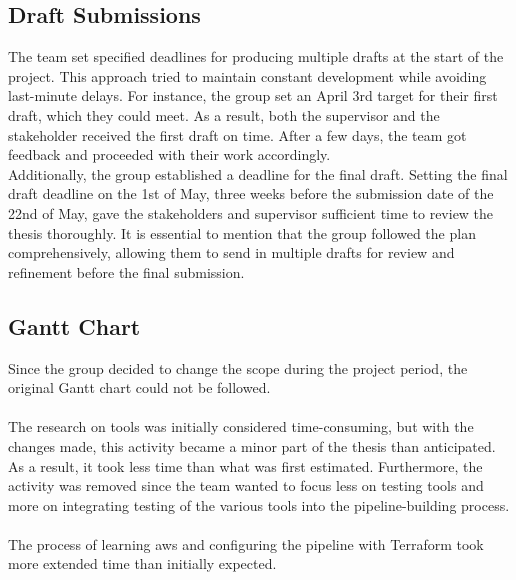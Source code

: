\subsection{Draft Submissions}
The team set specified deadlines for producing multiple drafts at the start of the project. This approach tried to maintain constant development while avoiding last-minute delays. For instance, the group set an April 3rd target for their first draft, which they could meet. As a result, both the supervisor and the stakeholder received the first draft on time. After a few days, the team got feedback and proceeded with their work accordingly. 
\\
Additionally, the group established a deadline for the final draft. Setting the final draft deadline on the 1st of May, three weeks before the submission date of the 22nd of May, gave the stakeholders and supervisor sufficient time to review the thesis thoroughly. It is essential to mention that the group followed the plan comprehensively, allowing them to send in multiple drafts for review and refinement before the final submission. 


\subsection{Gantt Chart}
Since the group decided to change the scope during the project period, the original Gantt chart could not be followed. 
\\~\\
The research on tools was initially considered time-consuming, but with the changes made, this activity became a minor part of the thesis than anticipated. As a result, it took less time than what was first estimated. Furthermore, the  activity was removed since the team wanted to focus less on testing tools and more on integrating testing of the various tools into the pipeline-building process. 
\\~\\           
The process of learning \acrshort{aws} and configuring the pipeline with Terraform took more extended time than initially expected.

